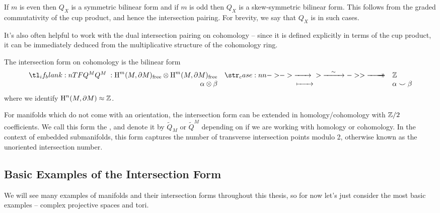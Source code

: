 \begin{remark}
	If $m$ is even then $Q_X$ is a symmetric bilinear form and if $m$ is odd then $Q_X$ is a skew-symmetric bilinear form. This follows from the graded commutativity of the cup product, and hence the intersection pairing. For brevity, we say that $Q_X$ is  in such cases.
\end{remark}

It's also often helpful to work with the dual intersection pairing on cohomology -- since it is defined explicitly in terms of the cup product, it can be immediately deduced from the multiplicative structure of the cohomology ring.
\begin{definition}
	The intersection form on cohomology is the bilinear form
	\begin{equation}
		\lkxfunc{Q^M}{\H^m(M,\partial M)_{\mathrm{free}}\otimes \H^m(M,\partial M)_{\mathrm{free}}}{\Z}{\alpha\otimes \beta}{\alpha\smile \beta}
	\end{equation}
	where we identify $\operatorname{H}^n(M,\partial M)\approx \mathbb{Z}$.
\end{definition}


\begin{remark}
	For manifolds which do not come with an orientation, the intersection form can be extended in homology/cohomology with $\mathbb{Z}/2$ coefficients. We call this form the , and denote it by $\widetilde{Q}_M$ or $\widetilde{Q}^M$ depending on if we are working with homology or cohomology. In the context of embedded submanifolds, this form captures the number of transverse intersection points modulo 2, otherwise known as the unoriented intersection number.
\end{remark}

\subsection{Basic Examples of the Intersection Form}

We will see many examples of manifolds and their intersection forms throughout this thesis, so for now let's just consider the most basic examples -- complex projective spaces and tori.

